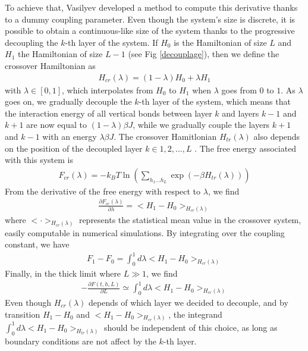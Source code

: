 To achieve that, Vasilyev \cite{vasilyev_universal_2009} developed a method to compute this derivative thanks to a dummy coupling parameter. Even though the system's size is discrete, it is possible to obtain a continuous-like size of the system thanks to the progressive decoupling the $k$-th layer of the system. If $H_0$ is the Hamiltonian of size $L$ and $H_1$ the Hamiltonian of size $L-1$ (see Fig \ref{decouplage}), then we define the crossover Hamiltonian as
\begin{align}
H_{cr}(\lambda) = (1-\lambda) H_0 + \lambda H_1
\label{hamil-trans}
\end{align}
with $\lambda \in [0,1]$, which interpolates from $H_0$ to $H_1$ when $\lambda$ goes from $0$ to $1$. As $\lambda$ goes on, we gradually decouple the $k$-th layer of the system, which means that the interaction energy of all vertical bonds between layer $k$ and layers $k-1$ and $k+1$ are now equal to $(1-\lambda)\beta J$, while we gradually couple the layers $k+1$ and $k-1$ with an energy $\lambda \beta J$.
The crossover Hamitlonian $H_{tr}(\lambda)$ also depends on the position of the decoupled layer $k \in {1,2,...,L}$ . The free energy associated with this system is
\begin{align}
F_{cr}(\lambda) = -k_B T \ln \left( \sum_{h_1 ... h_L} \exp(-\beta H_{tr}(\lambda)) \right)
\end{align}
From the derivative of the free energy with respect to $\lambda$, we find
\begin{align}
\frac{\partial F_{cr}(\lambda)}{\partial\lambda} = < H_1 - H_0>_{H_{cr}(\lambda)}
\end{align}
where $< \cdot >_{H_{cr}(\lambda)}$ represents the statistical mean value in the crossover system, easily computable in numerical simulations. By integrating over the coupling constant, we have
\begin{align}
F_1 - F_0 = \int_0^1 d\lambda < H_1 - H_0>_{H_{cr}(\lambda)}
\end{align}
Finally, in the thick limit where $L\gg1$, we find
\begin{align}
- \frac{\partial F(t,h,L)}{\partial L} \simeq \int_0^1 d\lambda < H_1 - H_0>_{H_{cr}(\lambda)}
\end{align}
Even though $H_{cr}(\lambda)$ depends of which layer we decided to decouple, and by transition $H_1-H_0$ and $< H_1 - H_0>_{H_{cr}(\lambda)}$, the integrand $\int_0^1 d\lambda < H_1 - H_0>_{H_{tr}(\lambda)}$ should be independent of this choice, as long as boundary conditions are not affect by the $k$-th layer.

